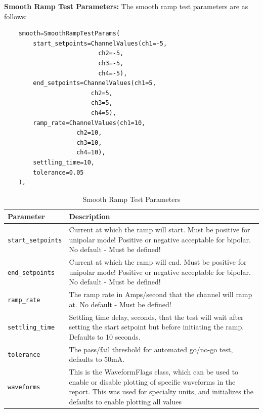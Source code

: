 \newpage
{}
\label{sec:smooth-ramp-test}
\noindent\normalsize\textbf{Smooth Ramp Test Parameters:} The smooth ramp test parameters are as follows:
\begin{verbatim}
	smooth=SmoothRampTestParams(
		start_setpoints=ChannelValues(ch1=-5,
					      ch2=-5,
					      ch3=-5,
					      ch4=-5),
		end_setpoints=ChannelValues(ch1=5,
					    ch2=5,
					    ch3=5,
					    ch4=5),
		ramp_rate=ChannelValues(ch1=10,
					ch2=10,
					ch3=10,
					ch4=10),
		settling_time=10,
		tolerance=0.05
	),
\end{verbatim}
\begin{table}[H]
	\centering
	\begin{tabular}{p{4cm}p{10cm}}
		\toprule
		\textbf{Parameter} & \textbf{Description} \\
		\midrule
		
		\texttt{start\_setpoints} &
		Current at which the ramp will start. Must be positive for unipolar mode! Positive or negative acceptable for bipolar. No default - Must be defined!\\
		
		\texttt{end\_setpoints} &
		Current at which the ramp will end. Must be positive for unipolar mode! Positive or negative acceptable for bipolar. No default - Must be defined!\\
		
		\texttt{ramp\_rate} &
		The ramp rate in Amps/second that the channel will ramp at. No default - Must be defined!\\
		
		\texttt{settling\_time} &
		Settling time delay, seconds, that the test will wait after setting the start setpoint but before initiating the ramp. Defaults to 10 seconds.\\
		
		\texttt{tolerance} &
		The pass/fail threshold for automated go/no-go test, defaults to 50mA.\\
		
		\texttt{waveforms} &
		This is the WaveformFlags class, which can be used to enable or disable plotting of specific waveforms in the report. This was used for specialty units, and initializes the defaults to enable plotting all values\\
		
		\bottomrule
	\end{tabular}
	\caption{Smooth Ramp Test Parameters}
	\label{tab:smooth-ramp-parameters}
\end{table}

